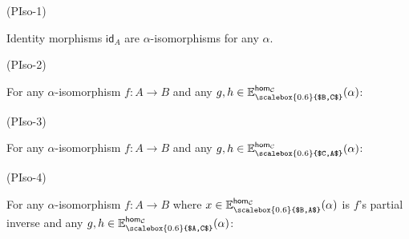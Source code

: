 \par\noindent  (PIso-1) 
 
Identity morphisms $\mathsf{id}_{A}$ are $\alpha$-isomorphisms for any $\alpha$.\par
 
 
 
\par\noindent  (PIso-2) 
 
For any $\alpha$-isomorphism $f:A\to B$ and any $g,h\in\mathbb{E}^{\mathsf{hom}_{\mathcal{C}}}_{\scalebox{0.6}{$B,C$}}(\alpha)$:\par
 
\begin{center}\end{center}
 
 
 
\par\noindent  (PIso-3) 
 
For any $\alpha$-isomorphism $f:A\to B$ and any $g,h\in\mathbb{E}^{\mathsf{hom}_{\mathcal{C}}}_{\scalebox{0.6}{$C,A$}}(\alpha)$:\par
 
\begin{center}\end{center}
 
 
 
\par\noindent  (PIso-4) 
 
For any $\alpha$-isomorphism $f:A\to B$ where $x\in\mathbb{E}^{\mathsf{hom}_{\mathcal{C}}}_{\scalebox{0.6}{$B,A$}}(\alpha)$ is $f$’s partial inverse and any $g,h\in\mathbb{E}^{\mathsf{hom}_{\mathcal{C}}}_{\scalebox{0.6}{$A,C$}}(\alpha)$:\par
 
